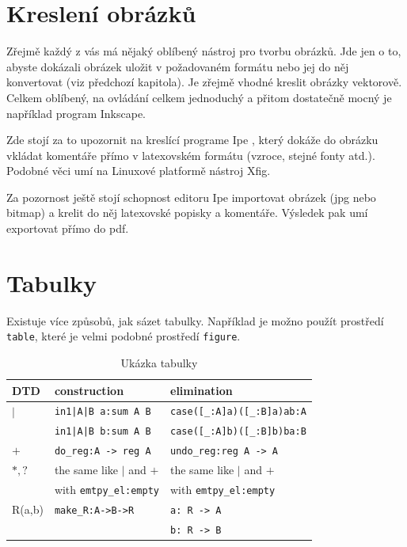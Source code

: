 \documentclass[11pt,twoside,a4paper]{book}
\begin{document}
\section{Kreslení obrázků}
Zřejmě každý z vás má nějaký oblíbený nástroj pro tvorbu obrázků. Jde jen o to, abyste dokázali obrázek uložit v požadovaném formátu nebo jej do něj konvertovat (viz předchozí kapitola). Je zřejmě vhodné kreslit obrázky vektorově. Celkem oblíbený, na ovládání celkem jednoduchý a přitom dostatečně mocný je například program Inkscape.

Zde stojí za to upozornit na kreslící programe Ipe \cite{ipe}, který dokáže do obrázku vkládat komentáře přímo v latexovském formátu (vzroce, stejné fonty atd.). Podobné věci umí na Linuxové platformě nástroj Xfig. 

Za pozornost ještě stojí schopnost editoru Ipe importovat obrázek (jpg nebo bitmap) a krelit do něj latexovské popisky a komentáře. Výsledek pak umí exportovat přímo do pdf.

\section{Tabulky}
Existuje více způsobů, jak sázet tabulky. Například je možno použít prostředí \verb|table|, které je velmi podobné prostředí \verb|figure|. 

\begin{table}
\begin{center}
\begin{tabular}{|l|l|l|}
\hline
\textbf{DTD} & \textbf{construction} & \textbf{elimination} \\
\hline
$\mid$ & \verb+in1|A|B a:sum A B+ & \verb+case([_:A]a)([_:B]a)ab:A+\\
&\verb+in1|A|B b:sum A B+ & \verb+case([_:A]b)([_:B]b)ba:B+\\
\hline
$+$&\verb+do_reg:A -> reg A+&\verb+undo_reg:reg A -> A+\\
\hline
$*,?$& the same like $\mid$ and $+$ & the same like $\mid$ and $+$\\
& with \verb+emtpy_el:empty+ & with \verb+emtpy_el:empty+\\
\hline
R(a,b) & \verb+make_R:A->B->R+ & \verb+a: R -> A+\\
 & & \verb+b: R -> B+\\
\hline
\end{tabular}
\end{center}
\caption{Ukázka tabulky}
\label{tab:tab1}
\end{table}
\end{document}
